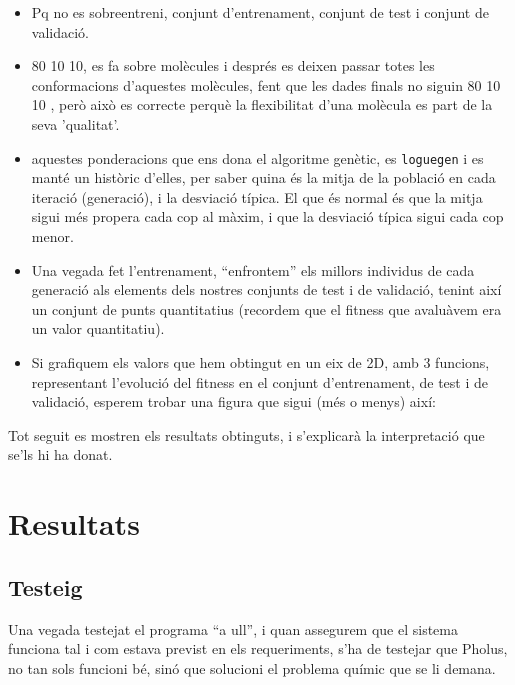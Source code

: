 \begin{itemize}
	\item Pq no es sobreentreni, conjunt d'entrenament, conjunt de test i conjunt
		de validació.
	\item 80 10 10, es fa sobre molècules i després es deixen passar totes les
		conformacions d'aquestes molècules, fent que les dades finals no siguin 80 10 10
		, però això es correcte perquè la flexibilitat d'una molècula es part de la seva
		'qualitat'.
	\item aquestes ponderacions que ens dona el algoritme genètic, es
		\texttt{loguegen} i es manté un històric d'elles, per saber quina és la mitja
		de la població en cada iteració (generació), i la desviació típica.  El que
		és normal és que la mitja sigui més propera cada cop al màxim, i que la
		desviació típica sigui cada cop menor.
	\item Una vegada fet l'entrenament, ``enfrontem'' els millors individus de
	cada generació als elements dels nostres conjunts de test i de validació,
	tenint així un conjunt de punts quantitatius (recordem que el fitness que
	avaluàvem era un valor quantitatiu).
	\item Si grafiquem els valors que hem obtingut en un eix de 2D, amb 3
	funcions, representant l'evolució del fitness en el conjunt d'entrenament, de
	test i de validació, esperem trobar una figura que sigui (més o menys) així:
\end{itemize}
 
Tot seguit es mostren els resultats obtinguts, i s'explicarà la interpretació
que se'ls hi ha donat.



\section{Resultats} %
\label{sec:Resultats}

\subsection{Testeig} %
\label{sub:Testeig}

Una vegada testejat el programa ``a ull'', i quan assegurem que el sistema
funciona tal i com estava previst en els requeriments, s'ha de testejar que
Pholus, no tan sols funcioni bé, sinó que solucioni el problema químic que se li
demana.


